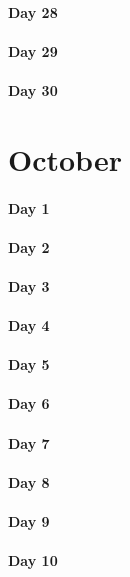 \documentclass[UTF8,a4paper,8pt]{ctexart}
\begin{document}
 	 \paragraph{Day 28      \quad     }
 	 \paragraph{Day 29      \quad     }   
 	 \paragraph{Day 30      \quad     }
\section{October}
 	 \paragraph{Day 1       \quad     }
 	 \paragraph{Day 2       \quad     }
 	 \paragraph{Day 3       \quad     }
 	 \paragraph{Day 4       \quad     }
 	 \paragraph{Day 5       \quad     }
 	 \paragraph{Day 6       \quad     }
 	 \paragraph{Day 7       \quad     }
 	 \paragraph{Day 8       \quad     }
 	 \paragraph{Day 9       \quad     }
 	 \paragraph{Day 10      \quad     }
\end{document}
